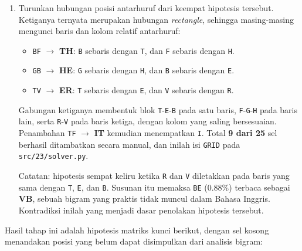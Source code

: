 \begin{enumerate}
  \texttt{UA} belum dicocokkan karena cukup sulit memetakan huruf \textit{plain} yang beririsan. 
  Melanjutkan ke \texttt{VT}/\texttt{TV}, keduanya muncul dengan frekuensi yang mirip, sehingga hipotesis
  selanjutnya adalah memetakan \texttt{VT}/\texttt{TV} ke \textbf{RE}/\textbf{ER}, karena memang 
  keduanya merupakan pasangan bolak-balik yang sama-sama sering muncul dalam Bahasa Inggris 
  (2.05\% dan 1.85\%). Pencocokan \texttt{GB} $\to$ \textbf{HE} juga
  terverifikasi lewat kemunculan \texttt{BG} $\to$ \textbf{EH}.

  \item Turunkan hubungan posisi antarhuruf dari keempat hipotesis tersebut. Ketiganya ternyata
  merupakan hubungan \textit{rectangle}, sehingga masing-masing mengunci baris dan kolom relatif
  antarhuruf:

  \begin{itemize}[nosep]
    \item \texttt{BF} $\to$ \textbf{TH}: \texttt{B} sebaris dengan \texttt{T}, dan \texttt{F} sebaris dengan \texttt{H}.
    \item \texttt{GB} $\to$ \textbf{HE}: \texttt{G} sebaris dengan \texttt{H}, dan \texttt{B} sebaris dengan \texttt{E}.
    \item \texttt{TV} $\to$ \textbf{ER}: \texttt{T} sebaris dengan \texttt{E}, dan \texttt{V} sebaris dengan \texttt{R}.
  \end{itemize}

  Gabungan ketiganya membentuk blok \texttt{T}-\texttt{E}-\texttt{B} pada satu baris,
  \texttt{F}-\texttt{G}-\texttt{H} pada baris lain, serta \texttt{R}-\texttt{V} pada baris ketiga, dengan
  kolom yang saling bersesuaian. Penambahan \texttt{TF} $\to$ \textbf{IT} kemudian menempatkan
  \texttt{I}. Total \textbf{9 dari 25} sel berhasil ditambatkan secara manual, dan inilah isi
  \texttt{GRID} pada \texttt{src/23/solver.py}.

  Catatan: hipotesis sempat keliru ketika \texttt{R} dan \texttt{V} diletakkan pada baris
  yang sama dengan \texttt{T}, \texttt{E}, dan \texttt{B}. Susunan itu memaksa \texttt{BE}
  (0.88\%) terbaca sebagai \textbf{VB}, sebuah bigram yang praktis tidak muncul dalam Bahasa
  Inggris. Kontradiksi inilah yang menjadi dasar penolakan hipotesis tersebut.
\end{enumerate}

Hasil tahap ini adalah hipotesis matriks kunci berikut, dengan sel kosong menandakan posisi yang belum
dapat disimpulkan dari analisis bigram:

